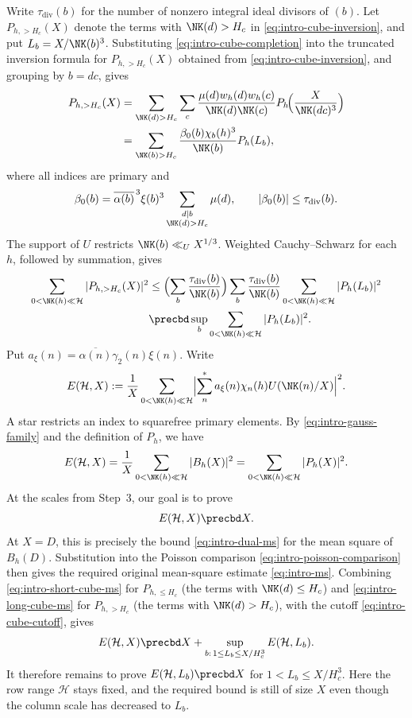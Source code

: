 Write $\tau_{\mathrm{div}}(b)$ for the number of nonzero integral ideal divisors of $(b)$.
Let $P_{h,>H_c}(X)$ denote the terms with $\NK(d)>H_c$ in
\eqref{eq:intro-cube-inversion}, and put $L_b=X/\NK(b)^3$.
Substituting \eqref{eq:intro-cube-completion} into the truncated inversion formula for $P_{h,>H_c}(X)$ obtained from \eqref{eq:intro-cube-inversion}, and grouping by $b=dc$, gives
\[
 \begin{aligned}
 P_{h,>H_c}(X)
 &=\sum_{\NK(d)>H_c}\sum_c
   \frac{\mu(d)w_h(d)w_h(c)}{\NK(d)\NK(c)}
   P_h\!\Bigl(\frac{X}{\NK(dc)^3}\Bigr)\\
 &=\sum_{\NK(b)>H_c}
   \frac{\beta_0(b)\chi_b(h)^3}{\NK(b)}P_h(L_b),
 \end{aligned}
\]
where all indices are primary and
\[
 \beta_0(b)=\overline{\alpha(b)}^{\,3}\xi(b)^3
       \sum_{\substack{d\mid b\\\NK(d)>H_c}}\mu(d),
 \qquad |\beta_0(b)|\le\tau_{\mathrm{div}}(b).
\]
The support of $U$ restricts $\NK(b)\ll_U X^{1/3}$.
Weighted Cauchy--Schwarz for each $h$, followed by summation, gives
\begin{equation}\label{eq:intro-long-cube-ms}
 \begin{aligned}
 \sum_{0<\NK(h)\ll\mathcal H}|P_{h,>H_c}(X)|^2
 &\le\Bigl(\sum_b\frac{\tau_{\mathrm{div}}(b)}{\NK(b)}\Bigr)
 \sum_b\frac{\tau_{\mathrm{div}}(b)}{\NK(b)}
 \sum_{0<\NK(h)\ll\mathcal H}|P_h(L_b)|^2\\
 &\precbd\sup_b\sum_{0<\NK(h)\ll\mathcal H}|P_h(L_b)|^2.
 \end{aligned}
\end{equation}
Put
$a_\xi(n)=\overline{\alpha(n)}\gamma_2(n)\xi(n)$. Write
\[
 E(\mathcal H,X)
 :=\frac1X\sum_{0<\NK(h)\ll\mathcal H}
 \Bigl|\sum_n^*a_\xi(n)\chi_n(h)U(\NK(n)/X)\Bigr|^2.
\]
A star restricts an index to squarefree primary elements.
By \eqref{eq:intro-gauss-family} and the definition of $P_h$, we have
\[
 E(\mathcal H,X)
 =\frac1X\sum_{0<\NK(h)\ll\mathcal H}|B_h(X)|^2
 =\sum_{0<\NK(h)\ll\mathcal H}|P_h(X)|^2.
\]
At the scales from Step~3, our goal is to prove
\begin{equation}\label{eq:intro-energy-target}
 E(\mathcal H,X)\precbd X.
\end{equation}
At $X=D$, this is precisely the bound \eqref{eq:intro-dual-ms}
for the mean square of $B_h(D)$. Substitution into the Poisson
comparison \eqref{eq:intro-poisson-comparison} then gives the
required original mean-square estimate \eqref{eq:intro-ms}.
Combining \eqref{eq:intro-short-cube-ms} for $P_{h,\le H_c}$
(the terms with $\NK(d)\le H_c$) and \eqref{eq:intro-long-cube-ms}
for $P_{h,>H_c}$ (the terms with $\NK(d)>H_c$), with the cutoff
\eqref{eq:intro-cube-cutoff}, gives
 \[
 E(\mathcal H,X)\precbd X + \sup_{b:\,1\le L_b\le X/H_c^3}E(\mathcal H,L_b).
 \]
It therefore remains to prove $E(\mathcal H,L_b)\precbd X$ for
$1<L_b\le X/H_c^3$. Here the row range $\mathcal H$ stays fixed,
and the required bound is still of size $X$ even though the column
scale has decreased to $L_b$.
 
